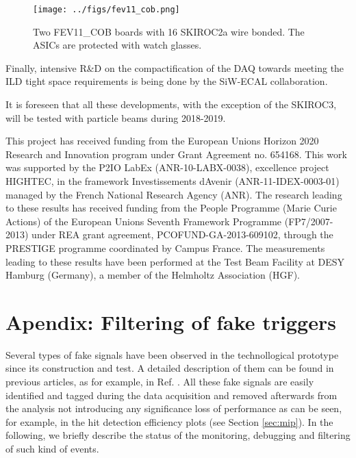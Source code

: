 \documentclass[a4paper,11pt]{article}
\begin{document}
\begin{figure}[!t]
  \centering
    \texttt{[image: ../figs/fev11\_cob.png]} 
  \caption{Two FEV11\_COB boards with 16 SKIROC2a wire bonded. The ASICs are protected with watch glasses.}
\label{cob}
\end{figure}

Finally, intensive R\&D on the compactification of
the DAQ towards meeting the ILD tight space requirements is being done by the SiW-ECAL collaboration.

It is foreseen that all these developments, with the exception of the SKIROC3, will be tested with particle beams during 2018-2019.


\acknowledgments

This project has received funding from the European Union{\textquotesingle}s Horizon 2020 Research and Innovation program under Grant Agreement no. 654168.
This work was supported by the P2IO LabEx (ANR-10-LABX-0038), excellence project HIGHTEC,
in the framework {\textquotesingle}Investissements d{\textquotesingle}Avenir{\textquotesingle}
(ANR-11-IDEX-0003-01) managed by the French National Research Agency (ANR).
The research leading to these results has received funding from the People Programme (Marie
Curie Actions) of the European Union{\textquotesingle}s Seventh Framework Programme (FP7/2007-2013)
under REA grant agreement, PCOFUND-GA-2013-609102, through the PRESTIGE
programme coordinated by Campus France.
The measurements leading to these results have been performed at the Test Beam Facility at DESY Hamburg (Germany), a member of the Helmholtz Association (HGF).

\appendix
\section{Apendix: Filtering of fake triggers}
\label{sec:retriggers}

Several types of fake signals have been observed in the technollogical prototype since its construction and test. A detailed description of them
can be found in previous articles, as for example, in Ref. \cite{Amjad:2014tha}. All these fake signals are easily identified
and tagged during the data acquisition and removed afterwards from the analysis
not introducing any significance loss of performance as can be seen, for example, in the hit detection efficiency plots (see Section \ref{sec:mip}).
In the following, we briefly describe the status of the monitoring, debugging and filtering
of such kind of events.
\end{document}
